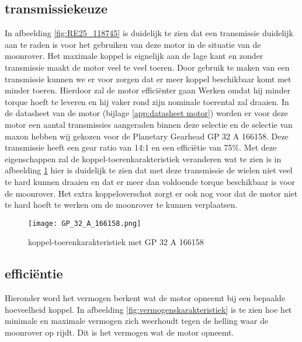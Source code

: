 \subsection{transmissiekeuze}
In afbeelding \ref{fig:RE25_118745} is duidelijk te zien dat een transmissie duidelijk aan te raden is voor het gebruiken van deze motor in de situatie van de moonrover. Het maximale koppel is eignelijk aan de lage kant en zonder transmissie maakt de motor veel te veel toeren. Door gebruik te maken van een transmissie kunnen we er voor zorgen dat er meer koppel beschikbaar komt met minder toeren. Hierdoor zal de motor efficiënter gaan Werken omdat hij minder torque hoeft te leveren en hij vaker rond zijn nominale toerental zal draaien. In de datasheet van de  motor (bijlage \ref{app:datasheet motor}) worden er voor deze motor een aantal transmissies aangeraden binnen deze selectie en de selectie van maxon hebben wij gekozen voor de Planetary Gearhead GP 32 A 166158. Deze transmissie heeft een gear ratio van 14:1 en een efficiëtie van 75\%. Met deze eigenschappen zal de koppel-toerenkarakteristiek veranderen wat te zien is in afbeelding \ref{fig:GP 32 A 166158} hier is duidelijk te zien dat met deze transmissie de wielen niet veel te hard kunnen draaien en dat er meer dan voldoende torque beschikbaar is voor de moonrover. Het extra koppeloverschot zorgt er ook nog voor dat de motor niet te hard hoeft te werken om de moonrover te kunnen verplaatsen.

        \begin{figure}[H]
                \centering
                \texttt{[image: GP\_32\_A\_166158.png]}
                \caption{koppel-toerenkarakteristiek met GP 32 A 166158}
                \label{fig:GP 32 A 166158}
        \end{figure}

\subsection{efficiëntie}

Hieronder word het vermogen berkent wat de motor opneemt bij een bepaalde hoeveelheid koppel. In afbeelding \ref{fig:vermogenskarakteristiek} is te zien hoe het minimale en maximale vermogen zich weerhoudt tegen de helling waar de moonrover op rijdt. Dit is het vermogen wat de motor opneemt.

